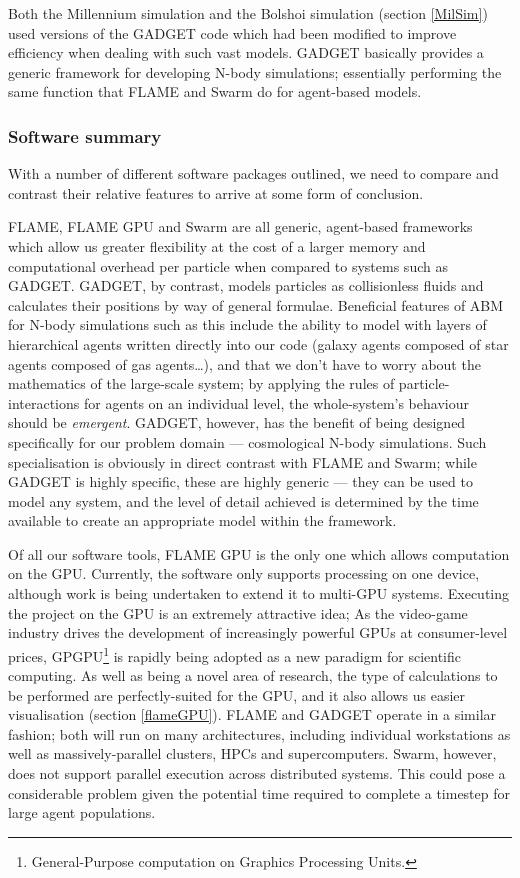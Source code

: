 \documentclass[11pt,a4paper]{article}
\begin{document}
Both the Millennium simulation and the Bolshoi simulation (section \ref{MilSim}) used versions of the GADGET code which had been modified to improve efficiency when dealing with such vast models. GADGET basically provides a generic framework for developing N-body simulations; essentially performing the same function that FLAME and Swarm do for agent-based models.

\subsubsection{Software summary}
With a number of different software packages outlined, we need to compare and contrast their relative features to arrive at some form of conclusion. 

FLAME, FLAME GPU and Swarm are all generic, agent-based frameworks which allow us greater flexibility at the cost of a larger memory and computational overhead per particle when compared to systems such as GADGET. GADGET, by contrast, models particles as collisionless fluids and calculates their positions by way of general formulae. Beneficial features of ABM for N-body simulations such as this include the ability to model with layers of hierarchical agents written directly into our code (galaxy agents composed of star agents composed of gas agents\ldots), and that we don't have to worry about the mathematics of the large-scale system; by applying the rules of particle-interactions for agents on an individual level, the whole-system's behaviour should be \emph{emergent}. GADGET, however, has the benefit of being designed specifically for our problem domain --- cosmological N-body simulations. Such specialisation is obviously in direct contrast with FLAME and Swarm; while GADGET is highly specific, these are highly generic --- they can be used to model any system, and the level of detail achieved is determined by the time available to create an appropriate model within the framework. 

Of all our software tools, FLAME GPU is the only one which allows computation on the GPU. Currently, the software only supports processing on one device, although work is being undertaken to extend it to multi-GPU systems. Executing the project on the GPU is an extremely attractive idea; As the video-game industry drives the development of increasingly powerful GPUs at consumer-level prices, GPGPU\footnote{General-Purpose computation on Graphics Processing Units.} is rapidly being adopted as a new paradigm for scientific computing. As well as being a novel area of research, the type of calculations to be performed are perfectly-suited for the GPU, and it also allows us easier visualisation (section \ref{flameGPU}). FLAME and GADGET operate in a similar fashion; both will run on many architectures, including individual workstations as well as massively-parallel clusters, HPCs and supercomputers. Swarm, however, does not support parallel execution across distributed systems. This could pose a considerable problem given the potential time required to complete a timestep for large agent populations.
\end{document}
